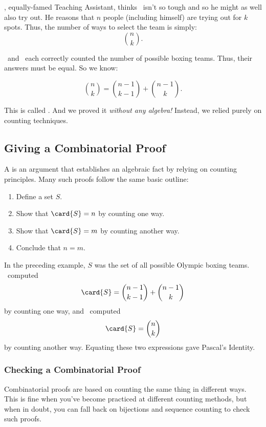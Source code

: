 \Jer, equally-famed Teaching Assistant, thinks \Jay\ isn't so tough
and so he might as well also try out.  He reasons that $n$ people
(including himself) are trying out for $k$ spots.  Thus, the number of
ways to select the team is simply:
%
\[
    \binom{n}{k}.
\]

\Jer\ and \Jay\ each correctly counted the number of possible boxing
teams.  Thus, their answers must be equal.  So we know:
%
\begin{lemma}
\begin{equation}\label{pascal-ident}
    \binom{n}{k} = \binom{n-1}{k-1} + \binom{n - 1}{k}.
\end{equation}
\end{lemma}
%
This is called .  And we proved it
\emph{without any algebra!}  Instead, we relied purely on counting
techniques.


\subsection{Giving a Combinatorial Proof}

A  is an argument that establishes an
algebraic fact by relying on counting principles.  Many such proofs
follow the same basic outline:
%
\begin{enumerate}

\item Define a set $S$.

\item Show that $\card{S} = n$ by counting one way.

\item Show that $\card{S} = m$ by counting another way.

\item Conclude that $n = m$.

\end{enumerate}
%
In the preceding example, $S$ was the set of all possible Olympic boxing
teams.  \Jay\ computed
\[
\card{S} = \binom{n-1}{k-1} + \binom{n-1}{k}
\]
by counting one way, and \Jer\ computed
\[
\card{S} = \binom{n}{k}
\]
by counting another way.  Equating these two expressions gave Pascal's
Identity.

\subsubsection{Checking a Combinatorial Proof}

Combinatorial proofs are based on counting the same thing in different
ways.  This is fine when you've become practiced at different counting
methods, but when in doubt, you can fall back on bijections and
sequence counting to check such proofs.

